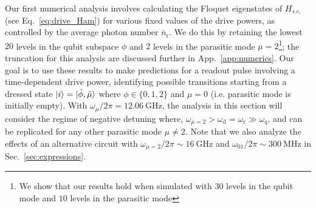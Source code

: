 \documentclass[%
reprint,
superscriptaddress,
 amsmath,amssymb,
 aps,
 prx,
longbibliography,
floatfix,
]{revtex4-2}
\begin{document}
Our first numerical analysis involves calculating the Floquet eigenstates of $H_{s.c.}$ (see Eq.~\ref{eq:drive_Ham}) for various fixed values of the drive powers, as controlled by the average photon number $\bar n_\textrm{r}$.  We do this by retaining the lowest $20$ levels in the qubit subspace $\phi$ and $2$ levels in the parasitic mode $\mu=2$\footnote{We show that our results hold when simulated with $30$ levels in the qubit mode and $10$ levels in the parasitic mode}; the truncation for this analysis are discussed further in App.~\ref{app:numerics}.
Our goal is to use these results to make predictions for a readout pulse involving a time-dependent drive power, identifying possible transitions starting from a dressed state $\ket{i} =\ket{\tilde{\phi}, \tilde{\mu}}$ where $\phi\in\{0,1,2\}$ and $\mu=0$ (i.e. parasitic mode is initially empty). With $\omega_\mu/2\pi=12.06 \ \mathrm{GHz}$, the analysis in this section will consider the regime of negative detuning where, $\omega_{\mu=2}>\omega_\textrm{d}=\omega_\textrm{r} \gg \omega_q$, and can be replicated for any other parasitic mode $\mu \neq 2$. Note that we also analyze the effects of an alternative circuit with $\omega_{\mu=2}/2\pi\sim 16 \ \mathrm{GHz}$ and $\omega_{01}/2\pi\sim 300 \ \mathrm{MHz}$ in Sec.~\ref{sec:expressions}.
\end{document}
